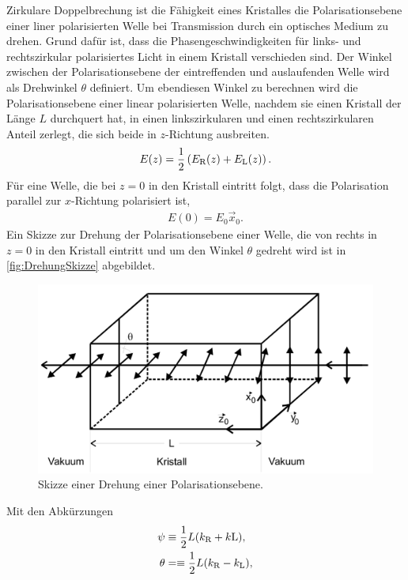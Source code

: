 Zirkulare Doppelbrechung ist die Fähigkeit eines Kristalles die Polarisationsebene einer liner polarisierten Welle bei Transmission durch ein optisches Medium zu drehen. Grund dafür 
ist, dass die Phasengeschwindigkeiten für links- und rechtszirkular polarisiertes Licht in einem Kristall verschieden sind. Der Winkel zwischen der Polarisationsebene der 
eintreffenden und auslaufenden Welle wird als Drehwinkel $\theta$ definiert. Um ebendiesen Winkel zu berechnen wird die Polarisationsebene einer linear polarisierten Welle, nachdem sie einen 
Kristall der Länge $L$ durchquert hat, in einen linkszirkularen und einen rechtszirkularen Anteil zerlegt, die sich beide in $z$-Richtung ausbreiten.
\begin{align}
    \label{eq:PolAnteil}
    E(z)= \frac 12 \left(E_{\text R}(z)+E_{\text L}(z)\right).
\end{align}
Für eine Welle, die bei $z=0$ in den Kristall eintritt folgt, dass die Polarisation parallel zur $x$-Richtung polarisiert ist,
\begin{align}
    E(0)=E_0\vec x_0.
\end{align}
Ein Skizze zur Drehung der Polarisationsebene einer Welle, die von rechts in $z=0$ in den Kristall eintritt und um den Winkel $\theta$ gedreht wird ist in \autoref{fig:DrehungSkizze} 
abgebildet.
\begin{figure}[H]
	\centering
	\includegraphics[width=0.6\linewidth]{data/PolarisationDrehung.png}
	\caption{Skizze einer Drehung einer Polarisationsebene.\cite{Anleitung46}}
	\label{fig:DrehungSkizze}
\end{figure}
Mit den Abkürzungen
\begin{align}
    \psi&\equiv\frac 12L(k_{\text R}+k{\text L}), \\
    \theta &=\equiv \frac 12L(k_{\text R}-k_{\text L}),
\end{align}
